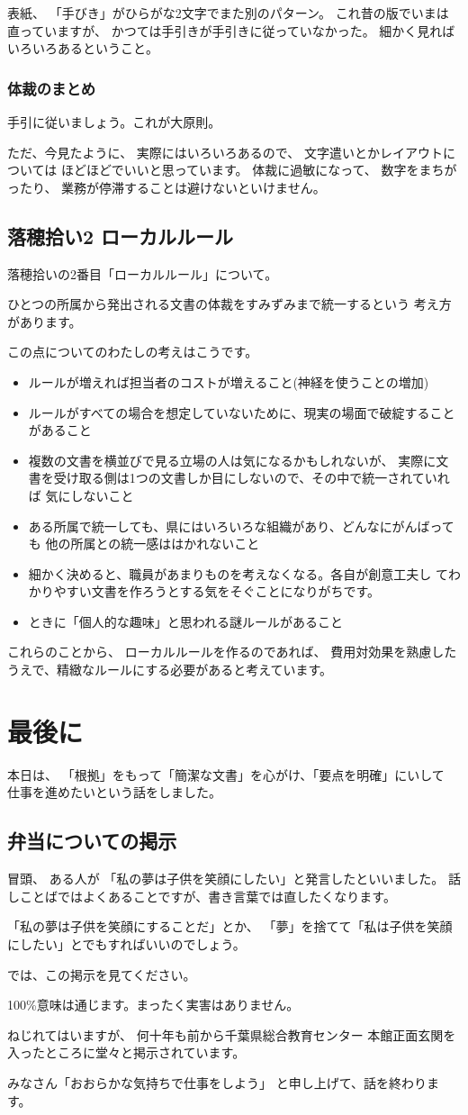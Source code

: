 \documentclass[uplatex,jis2004,dvipdfmx,14pt]{jsarticle}
\begin{document}
表紙、
「手びき」がひらがな2文字でまた別のパターン。
これ昔の版でいまは直っていますが、
かつては手引きが手引きに従っていなかった。
細かく見ればいろいろあるということ。


\subsubsection{体裁のまとめ}
手引に従いましょう。これが大原則。

ただ、今見たように、
実際にはいろいろあるので、
文字遣いとかレイアウトについては
ほどほどでいいと思っています。
体裁に過敏になって、
数字をまちがったり、
業務が停滞することは避けないといけません。

\newpage
\subsection{落穂拾い2 ローカルルール}
落穂拾いの2番目「ローカルルール」について。

ひとつの所属から発出される文書の体裁をすみずみまで統一するという
考え方があります。

この点についてのわたしの考えはこうです。

\begin{itemize}
\item ルールが増えれば担当者のコストが増えること(神経を使うことの増加)
\item ルールがすべての場合を想定していないために、現実の場面で破綻することがあること
\item 複数の文書を横並びで見る立場の人は気になるかもしれないが、
実際に文書を受け取る側は1つの文書しか目にしないので、その中で統一されていれば
気にしないこと
\item ある所属で統一しても、県にはいろいろな組織があり、どんなにがんばっても
他の所属との統一感ははかれないこと
 \item 細かく決めると、職員があまりものを考えなくなる。各自が創意工夫し
      てわかりやすい文書を作ろうとする気をそぐことになりがちです。
\item ときに「個人的な趣味」と思われる謎ルールがあること
\end{itemize}

これらのことから、
ローカルルールを作るのであれば、
費用対効果を熟慮したうえで、精緻なルールにする必要があると考えています。

\newpage

\section{最後に}
本日は、
「根拠」をもって「簡潔な文書」を心がけ、「要点を明確」にいして
仕事を進めたいという話をしました。

\subsection{弁当についての掲示}
冒頭、
ある人が
「私の夢は子供を笑顔にしたい」と発言したといいました。
話しことばではよくあることですが、書き言葉では直したくなります。

「私の夢は子供を笑顔にすることだ」とか、
「夢」を捨てて「私は子供を笑顔にしたい」とでもすればいいのでしょう。

では、この掲示を見てください。

100\%意味は通じます。まったく実害はありません。

ねじれてはいますが、
何十年も前から千葉県総合教育センター
本館正面玄関を入ったところに堂々と掲示されています。

みなさん「おおらかな気持ちで仕事をしよう」
と申し上げて、話を終わります。
\end{document}
